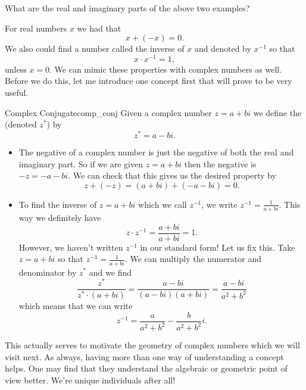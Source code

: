         \begin{exercise}
        What are the real and imaginary parts of the above two examples?
        \end{exercise}
        
        For real numbers $x$ we had that
        \[
        x+(-x)=0.
        \]
        We also could find a number called the inverse of $x$ and denoted by $x^{-1}$ so that
        \[
        x\cdot x^{-1}=1,
        \]
        unless $x=0$. We can mimic these properties with complex numbers as well. Before we do this, let me introduce one concept first that will prove to be very useful. 
        
        \begin{df}{Complex Conjugate}{comp_conj}
        Given a complex number $z=a+bi$ we define the  (denoted $z^*$) by
        \[
        z^* = a-bi.
        \]
        \end{df}
        
        \begin{itemize}
            \item The negative of a complex number is just the negative of both the real and imaginary part. So if we are given $z=a+bi$ then the negative is $-z=-a-bi$.  We can check that this gives us the desired property by
            \[
            z+(-z)=(a+bi)+(-a-bi)=0.
            \]
            \item To find the inverse of $z=a+bi$ which we call $z^{-1}$, we write $z^{-1}=\frac{1}{a+bi}$.  This way we definitely have
            \[
            z\cdot z^{-1}=\frac{a+bi}{a+bi}=1.
            \]
            However, we haven't written $z^{-1}$ in our standard form! Let us fix this. Take $z=a+bi$ so that $z^{-1}=\frac{1}{a+bi}$.  We can multiply the numerator and denominator by $z^*$ and we find
            \[
            \frac{z^*}{z^*\cdot (a+bi)}=\frac{a-bi}{(a-bi)(a+bi)}=\frac{a-bi}{a^2+b^2}
            \]
            which means that we can write
            \[
            z^{-1}=\frac{a}{a^2+b^2}-\frac{b}{a^2+b^2}i.
            \]
        \end{itemize}
        
        This actually serves to motivate the geometry of complex numbers which we will visit next. As always, having more than one way of understanding a concept helps. One may find that they understand the algebraic or geometric point of view better.  We're unique individuals after all!
        
